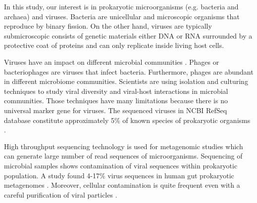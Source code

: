 \documentclass[conference]{IEEEtran}
\begin{document}
In this study, our interest is in prokaryotic microorganisms (e.g. bacteria and archaea) and viruses. Bacteria are unicellular and microscopic organisms that reproduce by binary fission. On the other hand, viruses are typically submicroscopic consists of genetic materials either DNA or RNA surrounded by a protective coat of proteins and can only replicate inside living host cells. 

Viruses have an impact on different microbial communities
. Phages or bacteriophages are viruses that infect bacteria. Furthermore, phages are abundant in different microbiome communities. %
Scientists are using isolation and culturing techniques to study viral diversity and viral-host interactions in microbial communities. Those techniques have many limitations because there is no universal marker gene for viruses. The sequenced viruses in NCBI RefSeq database constitute approximately 5\% of known species of prokaryotic organisms \cite{roux2015viral}.

High throughput sequencing technology is used for metagenomic studies which can generate large number of read  sequences of microorganisms. %
Sequencing of microbial samples shows contamination of viral sequences within prokaryotic population. A study found 4-17\% virus sequences in human gut prokaryotic metagenomes \cite{minot2011human}. Moreover, cellular contamination is quite frequent even with a careful purification of viral particles%
.
\end{document}
